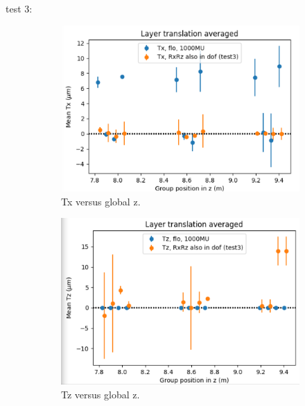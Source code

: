 
test 3:
\begin{figure}
  \centering
  \begin{subfigure}[b]{0.3\textwidth}
    \centering
    \includegraphics[width=\textwidth]{plots/july_28/Tx.png}
    \caption{Tx versus global z.}
  \end{subfigure}
  \hfill
  \begin{subfigure}[b]{0.3\textwidth}
    \centering
    \includegraphics[width=\textwidth]{plots/july_28/Tz.png}
    \caption{Tz versus global z.}
  \end{subfigure}
  \hfill
  \begin{subfigure}[b]{0.3\textwidth}

\end{subfigure}
\end{figure}

